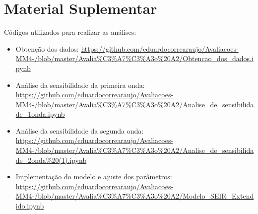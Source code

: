 \documentclass[12pt]{article}
\begin{document}
\section{Material Suplementar}
Códigos utilizados para realizar as análises:
\begin{itemize}
    \item Obtenção dos dados: \url{https://github.com/eduardocorrearaujo/Avaliacoes-MM4-/blob/master/Avalia\%C3\%A7\%C3\%A3o\%20A2/Obtencao_dos_dados.ipynb}
    \item Análise da sensibilidade da primeira onda: \url{https://github.com/eduardocorrearaujo/Avaliacoes-MM4-/blob/master/Avalia\%C3\%A7\%C3\%A3o\%20A2/Analise_de_sensibilidade_1onda.ipynb}
    \item Análise da sensibilidade da segunda onda: \url{https://github.com/eduardocorrearaujo/Avaliacoes-MM4-/blob/master/Avalia\%C3\%A7\%C3\%A3o\%20A2/Analise_de_sensibilidade_2onda\%20(1).ipynb}
    \item Implementação do modelo e ajuste dos parâmetros: \url{https://github.com/eduardocorrearaujo/Avaliacoes-MM4-/blob/master/Avalia\%C3\%A7\%C3\%A3o\%20A2/Modelo_SEIR_Extendido.ipynb}
    
\end{itemize}



\end{document}
